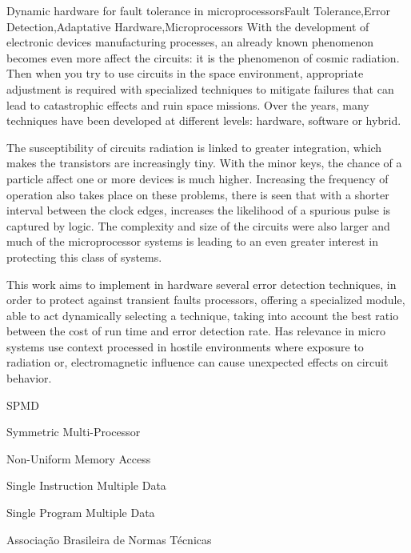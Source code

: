 \documentclass[pgmicro,diss,openright,oneside]{iiufrgs}
\begin{document}
\begin{englishabstract}{Dynamic hardware for fault tolerance in microprocessors}{Fault Tolerance,Error Detection,Adaptative Hardware,Microprocessors}
With the development of electronic devices manufacturing processes, an already known phenomenon becomes even more affect the circuits: it is the phenomenon of cosmic radiation. Then when you try to use circuits in the space environment, appropriate adjustment is required with specialized techniques to mitigate failures that can lead to catastrophic effects and ruin space missions. Over the years, many techniques have been developed at different levels: hardware, software or hybrid.

The susceptibility of circuits radiation is linked to greater integration, which makes the transistors are increasingly tiny. With the minor keys, the chance of a particle affect one or more devices is much higher. Increasing the frequency of operation also takes place on these problems, there is seen that with a shorter interval between the clock edges, increases the likelihood of a spurious pulse is captured by logic. The complexity and size of the circuits were also larger and much of the microprocessor systems is leading to an even greater interest in protecting this class of systems.

This work aims to implement in hardware several error detection techniques, in order to protect against transient faults processors, offering a specialized module, able to act dynamically selecting a technique, taking into account the best ratio between the cost of run time and error detection rate. Has relevance in micro systems use context processed in hostile environments where exposure to radiation or, electromagnetic influence can cause unexpected effects on circuit behavior.
\end{englishabstract}

\begin{listofabbrv}{SPMD}
        \item[SMP] Symmetric Multi-Processor
        \item[NUMA] Non-Uniform Memory Access
        \item[SIMD] Single Instruction Multiple Data
        \item[SPMD] Single Program Multiple Data
        \item[ABNT] Associação Brasileira de Normas Técnicas
\end{listofabbrv}
\end{document}
